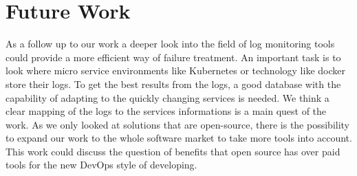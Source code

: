 \section{Future Work}
\label{futurework}
As a follow up to our work a deeper look into the field of log monitoring tools could provide a more efficient way of failure treatment. An important task is to look where micro service environments like Kubernetes or technology like docker store their logs. To get the best results from the logs, a good database with the capability of adapting to the quickly changing services is needed. We think a clear mapping of the logs to the services informations is a main quest of the work.
As we only looked at solutions that are open-source, there is the possibility to expand our work to the whole software market to take more tools into account. This work could discuss the question of benefits that open source has over paid tools for the new DevOps style of developing.

